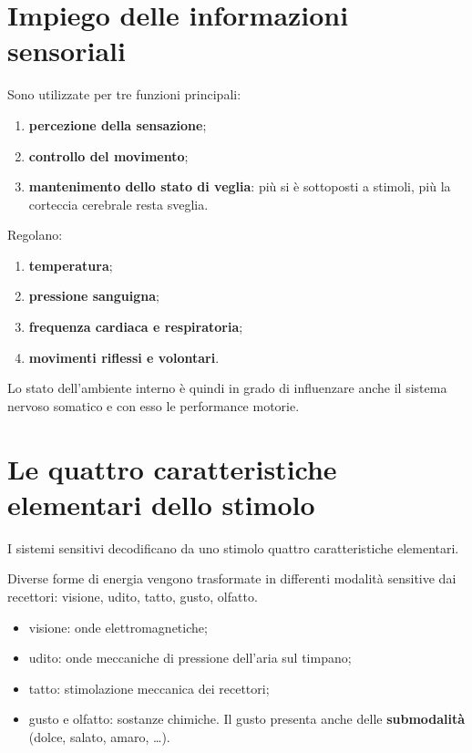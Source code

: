 \section{Impiego delle informazioni sensoriali}

Sono utilizzate per tre funzioni principali:
\begin{enumerate}
  \item \textbf{percezione della sensazione};
  \item \textbf{controllo del movimento};
  \item \textbf{mantenimento dello stato di veglia}: più si è sottoposti a stimoli, più la
    corteccia cerebrale resta sveglia.
\end{enumerate}

Regolano:
\begin{enumerate}
  \item \textbf{temperatura};
  \item \textbf{pressione sanguigna};
  \item \textbf{frequenza cardiaca e respiratoria};
  \item \textbf{movimenti riflessi e volontari}.
\end{enumerate}
Lo stato dell'ambiente interno è quindi in grado di influenzare anche il sistema nervoso somatico
e con esso le performance motorie.

\section{Le quattro caratteristiche elementari dello stimolo}

I sistemi sensitivi decodificano da uno stimolo quattro caratteristiche elementari.

Diverse forme di energia vengono trasformate in differenti modalità sensitive dai recettori:
visione, udito, tatto, gusto, olfatto.
\begin{itemize}
  \item visione: onde elettromagnetiche;
  \item udito: onde meccaniche di pressione dell'aria sul timpano;
  \item tatto: stimolazione meccanica dei recettori;
  \item gusto e olfatto: sostanze chimiche. Il gusto presenta anche delle \textbf{submodalità}
    (dolce, salato, amaro, \dots).
\end{itemize}

